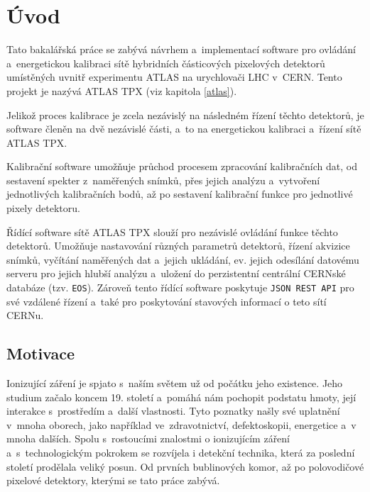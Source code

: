 

\chapter{Úvod}\label{chap01}
Tato bakalářská práce se zabývá návrhem a~implementací software pro ovládání a~energetickou kalibraci sítě hybridních částicových pixelových detektorů umístěných uvnitř experimentu ATLAS na urychlovači LHC v~CERN. Tento projekt je nazývá ATLAS TPX (viz kapitola \ref{atlas}).

Jelikož proces kalibrace je zcela nezávislý na následném řízení těchto detektorů, je software členěn na dvě nezávislé části, a~to na energetickou kalibraci a~řízení sítě  ATLAS TPX.

Kalibrační software umožňuje průchod procesem zpracování kalibračních dat, od sestavení spekter z~naměřených snímků, přes jejich analýzu a~vytvoření jednotlivých kalibračních bodů, až po sestavení kalibrační funkce pro jednotlivé pixely detektoru.

Řídící software sítě ATLAS TPX slouží pro nezávislé ovládání funkce těchto detektorů. Umožňuje nastavování různých parametrů detektorů, řízení akvizice snímků, vyčítání naměřených dat a~jejich ukládání, ev. jejich odesílání datovému serveru pro jejich hlubší analýzu a~uložení do perzistentní centrální CERNské databáze (tzv. \texttt{EOS}). Zároveň tento řídící software poskytuje \texttt{JSON REST API} pro své vzdálené řízení a~také pro poskytování stavových informací o teto sítí CERNu.


\section{Motivace}
Ionizující záření je spjato s~naším světem už od počátku jeho existence. Jeho studium začalo koncem 19. století a~pomáhá nám pochopit podstatu hmoty, její interakce s~prostředím a~další vlastnosti. Tyto poznatky našly své uplatnění v~mnoha oborech, jako například ve~zdravotnictví, defektoskopii, energetice a~v mnoha dalších. Spolu s~rostoucími znalostmi o ionizujícím záření a~s~technologickým pokrokem se rozvíjela i detekční technika, která za poslední století prodělala veliký posun. Od prvních bublinových komor, až po polovodičové pixelové detektory, kterými se tato práce zabývá. 
	
